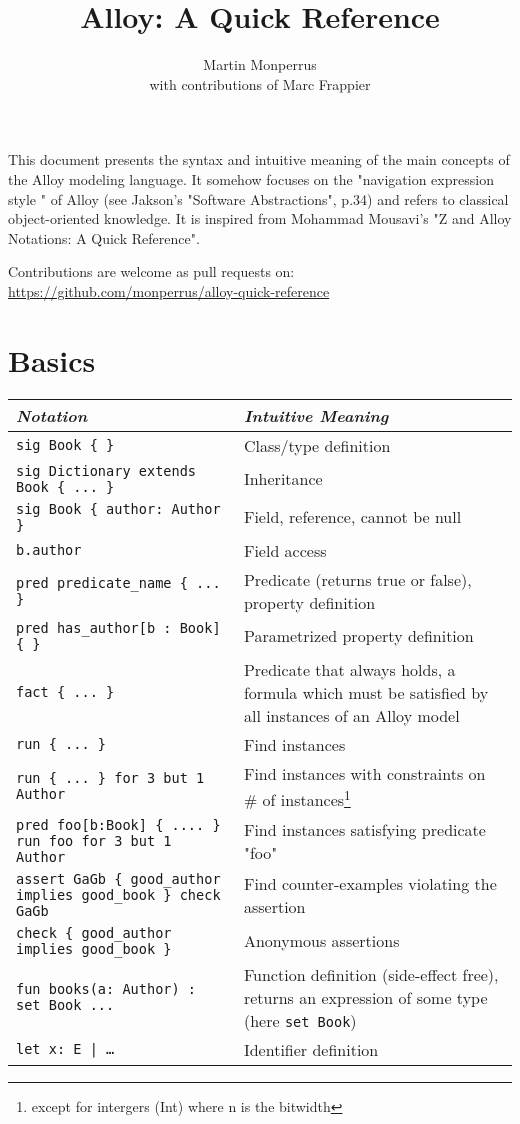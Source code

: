 \documentclass{article}
\title{Alloy: A Quick Reference}
\author{Martin Monperrus\\ with contributions of Marc Frappier}
\newlength\tw
\begin{document}
\maketitle

\noindent This document presents the syntax and intuitive meaning of the main concepts of the Alloy modeling language. It somehow focuses on the "navigation expression style " of Alloy (see Jakson's "Software Abstractions", p.34) and refers to classical object-oriented knowledge. It is inspired from Mohammad Mousavi's "Z and Alloy Notations: A Quick Reference".
\medskip

\noindent Contributions are welcome as pull requests on:\\ \url{https://github.com/monperrus/alloy-quick-reference}

\section{Basics}

\begin{longtable}{|p{\tw}|p{\tw}|}
\hline
\emph{Notation} & \emph{Intuitive Meaning} \\
\hline
\texttt{sig Book \{ \}} & Class/type definition \\
\hline
\texttt{sig Dictionary extends Book \{ ... \}} & Inheritance \\
\hline
\texttt{sig Book \{ author: Author \}} & Field, reference, cannot be null \\
\hline
\texttt{b.author} & Field access\\
\hline
\texttt{pred predicate\_name \{ ... \}} & Predicate (returns true or false), property definition \\
\hline
\texttt{pred has\_author[b : Book] \{  \}} & Parametrized property definition \\
\hline
\texttt{fact \{ ... \}} & Predicate that always holds, a formula which must be satisfied by all instances of an Alloy model\\
\hline
\texttt{run \{ ... \}} & Find instances \\
\hline
\texttt{run \{ ... \} for 3 but 1 Author} & Find instances with constraints on # of instances\footnote{except for intergers (Int) where n is the bitwidth}\\
\hline
\texttt{pred foo[b:Book] \{ .... \}\newline
run foo for 3 but 1 Author} & Find instances satisfying predicate "foo" \\
\hline
\texttt{assert GaGb \{ good\_author implies  good\_book \}\newline
check GaGb} & Find counter-examples violating the assertion \\
\hline
\texttt{check \{ good\_author implies  good\_book \} } & Anonymous assertions \\
\hline
\texttt{fun books(a: Author) : set Book {...}} & Function definition (side-effect free), returns an expression of some type (here \texttt{set Book}) \\
\hline
\texttt{let x: E | \ldots} & Identifier definition\\
\hline
\end{longtable}
\end{document}
